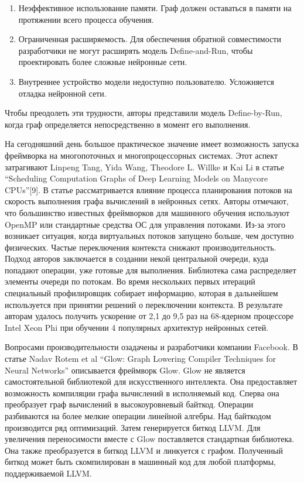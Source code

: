 \begin{enumerate}
	\item Неэффективное использование памяти. Граф должен оставаться в памяти на протяжении всего процесса обучения. 
	\item Ограниченная расширяемость. Для обеспечения обратной совместимости разработчики не могут расширять модель Define-and-Run, чтобы проектировать более сложные нейронные сети. 
	\item Внутреннее устройство модели недоступно пользователю. Усложняется отладка нейронной сети. 
\end{enumerate}
Чтобы преодолеть эти трудности, авторы представили модель Define-by-Run, когда граф определяется непосредственно в момент его выполнения.
\par
На сегодняшний день большое практическое значение имеет возможность запуска фреймворка на многопоточных и многопроцессорных системах. Этот аспект затрагивают Linpeng Tang, Yida Wang, Theodore L. Willke и Kai Li в статье “Scheduling Computation Graphs of Deep Learning Models on Manycore CPUs”[9]. В статье рассматривается влияние процесса планирования потоков на скорость выполнения графа вычислений в нейронных сетях. Авторы отмечают, что большинство известных фреймворков для машинного обучения используют OpenMP или стандартные средства ОС для управления потоками. Из-за этого возникает ситуация, когда виртуальных потоков запущено больше, чем доступно физических. Частые переключения контекста снижают производительность. Подход авторов заключается в создании некой центральной очереди, куда попадают операции, уже готовые для выполнения. Библиотека сама распределяет элементы очереди по потокам. Во время нескольких первых итераций специальный профилировщик собирает информацию, которая в дальнейшем используется при принятии решений о переключении контекста. В результате авторам удалось получить ускорение от 2,1 до 9,5 раз на 68-ядерном процессоре Intel Xeon Phi при обучении 4 популярных архитектур нейронных сетей. 
\par
Вопросами производительности озадачены и разработчики компании Facebook. В статье Nadav Rotem et al “Glow: Graph Lowering Compiler Techniques for Neural Networks” описывается фреймворк Glow. Glow не является самостоятельной библиотекой для искусственного интеллекта. Она предоставляет возможность компиляции графа вычислений в исполняемый код. Сперва она преобразует граф вычислений в высокоуровневый байткод. Операции разбиваются на более мелкие операции линейной алгебры. Над байткодом производится ряд оптимизаций. Затем генерируется биткод LLVM. Для увеличения переносимости вместе с Glow поставляется стандартная библиотека. Она также преобразуется в биткод LLVM и линкуется с графом. Полученный биткод может быть скомпилирован в машинный код для любой платформы, поддерживаемой LLVM.

